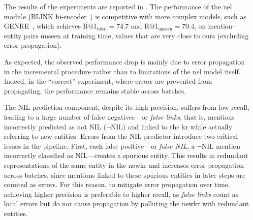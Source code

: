 


The results of the experiments are reported in .
The performance of the \acl{nel} module (BLINK bi-encoder~\cite{blink}) is competitive with more complex models, such as GENRE~\cite{decao2021autoregressive}, which achieves R@1$_\text{total} = 74.7$ and R@1$_\text{unseen} = 70.4$, on mention--entity pairs unseen at training time, values that are very close to ours (excluding error propagation).

As expected, the observed performance drop is mainly due to error propagation in the incremental procedure rather than to limitations of the \ac{nel} model itself. 
Indeed, in the ``correct'' experiment, where errors are prevented from propagating, the performance remains stable across batches.

The NIL prediction component, despite its high precision, suffers from low recall, leading to a large number of false negatives---or \emph{false links}, that is, mentions incorrectly predicted as not NIL ($\neg$NIL) and linked to the \ac{kr} while actually referring to new entities.
Errors from the NIL predictor introduce two critical issues in the pipeline.
First, each false positive---or \emph{false NIL}, \ie a $\neg$NIL mention incorrectly classified as NIL---creates a spurious entity.
This results in redundant representations of the same entity in the \ac{newkr} and increases error propagation across batches, since mentions linked to these spurious entities in later steps are counted as errors.
For this reason, to mitigate error propagation over time, achieving higher precision is preferable to higher recall, as \emph{false links} count as local errors but do not cause propagation by polluting the \ac{newkr} with redundant entities.


